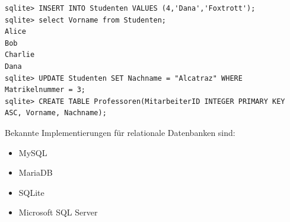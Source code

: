 \documentclass[titlepage]{report}
\begin{document}
\begin{minipage}{\linewidth}
\begin{lstlisting}[caption={Verwendung von Structured Query Language},label={lst:sqlexample}]
sqlite> INSERT INTO Studenten VALUES (4,'Dana','Foxtrott');
sqlite> select Vorname from Studenten;
Alice
Bob
Charlie
Dana
sqlite> UPDATE Studenten SET Nachname = "Alcatraz" WHERE Matrikelnummer = 3;
sqlite> CREATE TABLE Professoren(MitarbeiterID INTEGER PRIMARY KEY ASC, Vorname, Nachname);
\end{lstlisting}
\end{minipage}
Bekannte Implementierungen für relationale Datenbanken sind:
\begin{itemize}
    \item MySQL
    \item MariaDB
    \item SQLite
    \item Microsoft SQL Server
\end{itemize}
\end{document}

